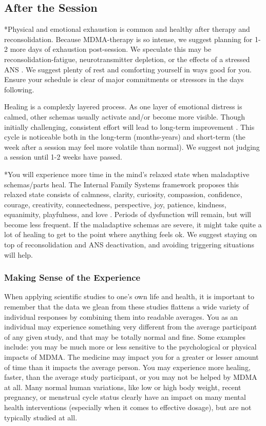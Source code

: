 \documentclass[12pt,letterpaper]{article}
\begin{document}
\subsection{After the Session}
\label{after}
*Physical and emotional exhaustion is common and healthy after therapy and reconsolidation. Because MDMA-therapy is so intense, we suggest planning for 1-2 more days of exhaustion post-session. We speculate this may be reconsolidation-fatigue, neurotransmitter depletion, or the effects of a stressed ANS \cite{razviPSIP}. We suggest plenty of rest and comforting yourself in ways good for you. Ensure your schedule is clear of major commitments or stressors in the days following. 

Healing is a complexly layered process. As one layer of emotional distress is calmed, other schemas usually activate and/or become more visible. Though initially challenging, consistent effort will lead to long-term improvement \cite{vanderKolkBody}. This cycle is noticeable both in the long-term (months-years) and short-term (the week after a session may feel more volatile than normal). We suggest not judging a session until 1-2 weeks have passed.

*You will experience more time in the mind's relaxed state when maladaptive schemas/parts heal. The Internal Family Systems framework proposes this relaxed state consists of calmness, clarity, curiosity, compassion, confidence, courage, creativity, connectedness, perspective, joy, patience, kindness, equanimity, playfulness, and love \cite{schwartzIFS}. Periods of dysfunction will remain, but will become less frequent. If the maladaptive schemas are severe, it might take quite a lot of healing to get to the point where anything feels ok. We suggest staying on top of reconsolidation and ANS deactivation, and avoiding triggering situations will help. 
\subsubsection{Making Sense of the Experience}
\label{sectionMakingSense}
When applying scientific studies to one's own life and health, it is important to remember that the data we glean from these studies flattens a wide variety of individual responses by combining them into readable averages. You as an individual may experience something very different from the average participant of any given study, and that may be totally normal and fine. Some examples include: you may be much more or less sensitive to the psychological or physical impacts of MDMA. The medicine may impact you for a greater or lesser amount of time than it impacts the average person. You may experience more healing, faster, than the average study participant, or you may not be helped by MDMA at all. Many normal human variations, like low or high body weight, recent pregnancy, or menstrual cycle status clearly have an impact on many mental health interventions (especially when it comes to effective dosage), but are not typically studied at all.
\end{document}
